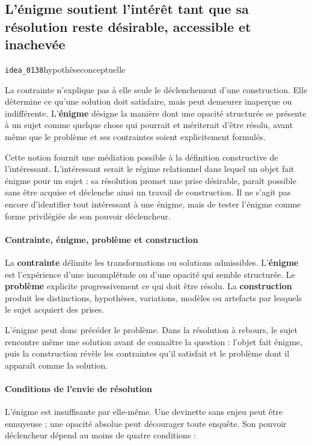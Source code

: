 \documentclass[10pt,a4paper]{article}
\begin{document}
\subsection{L'énigme soutient l'intérêt tant que sa résolution reste désirable, accessible et inachevée}
{\small\color{metadata} \texttt{idea\_0138}\quad\textbullet\quad hypothèse\quad\textbullet\quad conceptuelle\par}

La contrainte n'explique pas à elle seule le déclenchement d'une construction. Elle détermine ce qu'une solution doit satisfaire, mais peut demeurer inaperçue ou indifférente. L'\textbf{énigme} désigne la manière dont une opacité structurée se présente à un sujet comme quelque chose qui pourrait et mériterait d'être résolu, avant même que le problème et ses contraintes soient explicitement formulés.

Cette notion fournit une médiation possible à la définition constructive de l'intéressant. L'intéressant serait le régime relationnel dans lequel un objet fait énigme pour un sujet : sa résolution promet une prise désirable, paraît possible sans être acquise et déclenche ainsi un travail de construction. Il ne s'agit pas encore d'identifier tout intéressant à une énigme, mais de tester l'énigme comme forme privilégiée de son pouvoir déclencheur.

\paragraph{Contrainte, énigme, problème et construction}
La \textbf{contrainte} délimite les transformations ou solutions admissibles. L'\textbf{énigme} est l'expérience d'une incomplétude ou d'une opacité qui semble structurée. Le \textbf{problème} explicite progressivement ce qui doit être résolu. La \textbf{construction} produit les distinctions, hypothèses, variations, modèles ou artefacts par lesquels le sujet acquiert des prises.

L'énigme peut donc précéder le problème. Dans la résolution à rebours, le sujet rencontre même une solution avant de connaître la question : l'objet fait énigme, puis la construction révèle les contraintes qu'il satisfait et le problème dont il apparaît comme la solution.

\paragraph{Conditions de l'envie de résolution}
L'énigme est insuffisante par elle-même. Une devinette sans enjeu peut être ennuyeuse ; une opacité absolue peut décourager toute enquête. Son pouvoir déclencheur dépend au moins de quatre conditions :
\end{document}
